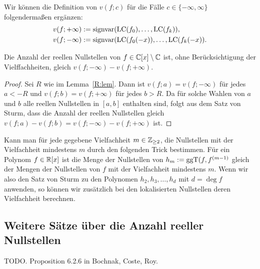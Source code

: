 \documentclass[11pt]{article}
\numberwithin{equation}{section}
\begin{document}
Wir können die Definition von $v(f;c)$ für die Fälle $c \in \{-\infty,\infty\}$ folgendermaßen ergänzen: 
\begin{align*}
		v(f;+\infty) & := \operatorname{signvar} (\operatorname{LC}(f_0),\ldots,\operatorname{LC}(f_k)), 
		\\ v(f;-\infty) & := \operatorname{signvar} (\operatorname{LC}(f_0(-x)), \ldots , \operatorname{LC}(f_k(-x)). 
\end{align*}

\begin{corollary} 
	Die Anzahl der reellen Nullstellen von $f \in \mathbb{C}[x] \setminus \mathbb{C}$ ist, ohne Berücksichtigung der Vielffachheiten, gleich $v(f;-\infty) - v(f;+\infty)$. 
\end{corollary} 
\begin{proof} 
	Sei $R$ wie im Lemma~\ref{R:lem}. Dann ist $v(f;a) = v(f;-\infty)$ für jedes $a < -R$ und $v(f;b) = v(f;+\infty)$ für jedes $b > R$. Da für solche Wahlen von $a$ und $b$ alle reellen Nullstellen in $[a,b]$ enthalten sind, folgt aus dem Satz von Sturm, dass die Anzahl der reellen Nullstellen gleich $v(f;a) - v(f;b) = v(f;-\infty) - v(f;+\infty)$ ist. 
\end{proof} 

\begin{remark} 
	Kann man für jede gegebene Vielfachheit $m \in \mathbb{Z}_{\ge 2}$, die Nullstellen mit der Vielfachheit mindestens $m$ durch den folgenden Trick bestimmen. Für ein Polynom $f \in \mathbb{R}[x]$ ist die Menge der Nullstellen  von  $h_m:=\operatorname{ggT}(f,f^{(m-1)}$ gleich der Mengen der Nullstellen von $f$ mit der Vielfachheit mindestens $m$. Wenn wir also den Satz von Sturm zu den Polynomen $h_2,h_3,\ldots,h_d$ mit $d = \deg f$ anwenden, so können wir  zusätzlich bei den lokalisierten Nullstellen deren Vielfachheit berechnen. 
\end{remark} 


\subsection{Weitere Sätze über die Anzahl reeller Nullstellen} 

TODO. Proposition 6.2.6 in Bochnak, Coste, Roy. 
\end{document}
